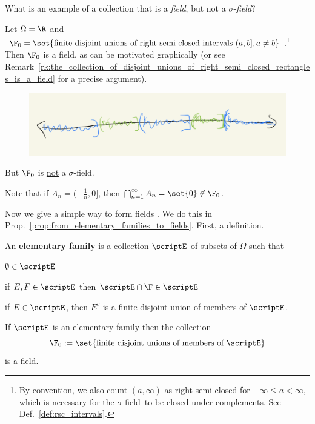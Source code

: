 \documentclass{article} %
\newif\ifActive
\renewcommand{\sf}{$\sigma$-field}
\begin{document}
\begin{example} What is an example of a collection that is a \textit{field}, but not a $\sigma$-\textit{field}?  

Let $\Omega=\R$ and $\F_0 = \set{\text{finite disjoint unions of right semi-closed intervals } (a,b], a \neq b}$.\footnote{By convention, we also count $(a, \infty)$ as right semi-closed for $-\infty\leq a < \infty$, which is necessary for the \sf\ to be closed under complements. See Def.~\ref{def:rsc_intervals}.}    Then $\F_0$ is a field, as can be motivated graphically (or see Remark~\ref{rk:the_collection_of_disjoint_unions_of_right_semi_closed_rectangles_is_a_field} for a precise argument). 

\begin{figure}[H]
\centering
\includegraphics[width=.6\textwidth]{images/rsc_intervals}	
\end{figure}

But $\F_0$ is \underline{not} a \sf.  

\ifActive 
\textbf{Workshop Exercise}: Prove this.
\else 
Note that if $A_n = (-\frac{1}{n},0]$, then $\bigcap_{n=1}^\infty A_n = \set{0}  \not\in \F_0$.
\fi 

\label{ex:field_of_finite_disjoint_unions_of_rsc_intervals}
\end{example}

Now we give a simple way to form fields \cite[pp. 23]{folland1999real}.  We do this in Prop.~\ref{prop:from_elementary_families_to_fields}. First, a definition. 

\begin{definition}
An \textbf{elementary family} is a collection $\scriptE$ of subsets of $\Omega$ such that 
\begin{alphabate}
\item $\emptyset \in \scriptE$
\item if $E,F \in \scriptE$ then $\scriptE \cap \F \in \scriptE$
\item if $E \in \scriptE$, then $E^c$ is a finite disjoint union of members of $\scriptE$.	
\end{alphabate}
\label{def:elementary_family}
\end{definition}

\begin{proposition}
If $\scriptE$ is an elementary family then the collection 
\[ \F_0 := \set{ \text{finite disjoint unions of members of } \scriptE} \]
is a field.
\label{prop:from_elementary_families_to_fields}	
\end{proposition}
\end{document}
